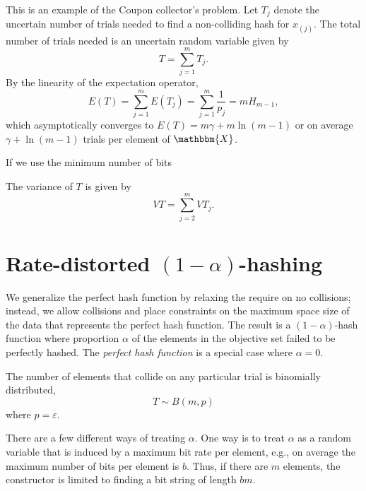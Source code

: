 \documentclass[hidelinks,11pt,final]{article}
\theoremstyle{plain}
\begin{document}
This is an example of the Coupon collector's problem.
Let $T_j$ denote the uncertain number of trials needed to find a non-colliding hash for $x_{(j)}$.
The total number of trials needed is an uncertain random variable given by
\begin{equation}
T = \sum_{j=1}^{m} T_j.
\end{equation}
By the linearity of the expectation operator,
\begin{equation}
E(T) = \sum_{j=1}^{m} E(T_j) = \sum_{j=1}^{m} \frac{1}{p_j} = m H_{m-1},
\end{equation}
which asymptotically converges to $E(T) = m \gamma + m \ln(m-1)$ or on average $\gamma + \ln (m-1)$ trials per element of $\mathbbm{X}$.

If we use the minimum number of bits

The variance of $T$ is given by
\begin{equation}
V{T} = \sum_{j=2}^{m }V{T_j}.
\end{equation}


\section{Rate-distorted $(1-\alpha)$-hashing}

We generalize the perfect hash function by relaxing the require on no collisions;
instead, we allow collisions and place constraints on the maximum space size of the data that represents the perfect hash function.
The result is a $(1-\alpha)$-hash function where proportion $\alpha$ of the elements in the objective set failed to be perfectly hashed.
The \emph{perfect hash function} is a special case where $\alpha=0$.

The number of elements that collide on any particular trial is binomially distributed,
\begin{equation}
	T \sim B(m,p)
\end{equation}
where $p = \varepsilon$.

There are a few different ways of treating $\alpha$.
One way is to treat $\alpha$ as a random variable that is induced by a maximum bit rate per element, e.g., on average the maximum number of bits per element is $b$.
Thus, if there are $m$ elements, the constructor is limited to finding a bit string of length $b m$.
\end{document}
